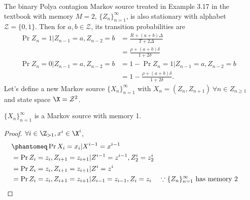 \documentclass[
  coursecode={MTHE 474},
  assignmentname={Homework \homeworknumber},
  studentnumber=20053722,
  name={Bryan Hoang},
  draft,
]{
  ltxanswer%
}
\begin{document}
  \begin{questions}
    \setcounter{question}{\questionnumber}
    \addtocounter{question}{-1}
    \question[15]\
    \begin{parts}
      \part{}
      \begin{solution}
        The binary Polya contagion Markov source treated in Example 3.17 in the textbook with memory \(M = 2\), \(\{Z_{n}\}_{n=1}^{\infty}\), is also stationary with alphabet \(\mathcal{Z} = \{0,1\}\). Then for \(a,b \in \mathcal{Z}\), its transition probabilities are
        \begin{align*}
          \Pr{Z_{n}=1|Z_{n-1}=a,Z_{n-2}=b} &= \frac{R+(a+b)\Delta}{T+2\Delta}         \\
                                           &= \frac{\rho+(a+b)\delta}{1+2\delta}      \\
          \Pr{Z_{n}=0|Z_{n-1}=a,Z_{n-2}=b} &= 1 - \Pr{Z_{n}=1|Z_{n-1}=a,Z_{n-2}=b}    \\
                                           &= 1 - \frac{\rho+(a+b)\delta}{1+2\delta}.
        \end{align*}
        Let's define a new Markov source \(\{X_{n}\}_{n=1}^{\infty}\) with \(X_{n}=(Z_{n},Z_{n+1})\ \forall n \in Z_{n\ge1}\) and state space \(\X=\mathcal{Z}^{2}\).
        \newline
        \begin{claim}
          \(\{X_{n}\}_{n=1}^{\infty}\) is a Markov source with memory 1.
        \end{claim}
        \begin{proof}
          \(\forall i \in \Z_{>1}, x^{i} \in \X^{i}\),
          \begin{align*}
             &\phantomeq \Pr{X_{i}=x_{i}|X^{i-1}=x^{i-1}}                                                                                        \\
             &= \Pr{Z_{i}=z_{i},Z_{i+1}=z_{i+1}|Z^{i-1}=z^{i-1},Z_{2}^{i}=z_{2}^{i}}                                                             \\
             &= \Pr{Z_{i}=z_{i},Z_{i+1}=z_{i+1}|Z^{i}=z^{i}}                                                                                     \\
             &= \Pr{Z_{i}=z_{i},Z_{i+1}=z_{i+1}|Z_{i-1}=z_{i-1},Z_{i}=z_{i}}         & &\text{\(\because\{Z_{n}\}_{n=1}^{\infty}\) has memory 2} \\

\end{align*}
\end{proof}
\end{solution}
\end{parts}
\end{questions}
\end{document}
